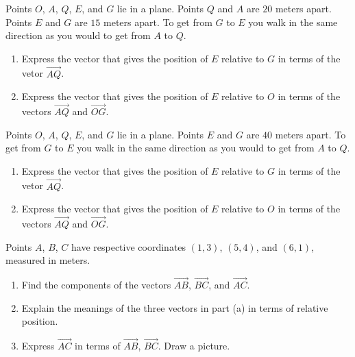 \documentclass{ximera}
\begin{document}
\begin{question} \label{QLdfreFefrer}
Points $O$, $A$, $Q$, $E$, and $G$ lie in a plane. Points $Q$ and $A$ are $20$ meters apart. Points $E$ and $G$ are $15$ meters apart. To get from $G$ to $E$ you walk in the same direction as you would to get from $A$ to $Q$.

\begin{enumerate}
\item Express the vector that gives the position of $E$ relative to $G$ in terms of the vetor $\overrightarrow{AQ}$.

\item Express the vector that gives the position of $E$ relative to $O$ in terms of the vectors $\overrightarrow{AQ}$ and $\overrightarrow{OG}$.
\end{enumerate}
\end{question}

\begin{question} \label{QLddferFefrer}
Points $O$, $A$, $Q$, $E$, and $G$ lie in a plane. Points $E$ and $G$ are $40$ meters apart. To get from $G$ to $E$ you walk in the same direction as you would to get from $A$ to $Q$.

\begin{enumerate}
\item Express the vector that gives the position of $E$ relative to $G$ in terms of the vetor $\overrightarrow{AQ}$.

\item Express the vector that gives the position of $E$ relative to $O$ in terms of the vectors $\overrightarrow{AQ}$ and $\overrightarrow{OG}$.
\end{enumerate}
\end{question}


\begin{question}  \label{QMNDVBed43}
Points $A$, $B$, $C$ have respective coordinates $(1,3)$, $(5,4)$, and $(6,1)$, measured in meters.
\begin{enumerate}
\item Find the components of the vectors $\overrightarrow{AB}$, $\overrightarrow{BC}$, and $\overrightarrow{AC}$.

\item Explain the meanings of the three vectors in part (a) in terms of relative position.

\item Express $\overrightarrow{AC}$ in terms of $\overrightarrow{AB}$, $\overrightarrow{BC}$. Draw a picture.
\end{enumerate}

\end{question}
\end{document}
